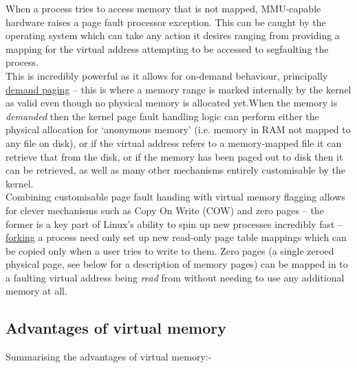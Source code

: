 When a process tries to access memory that is not mapped, MMU-capable hardware
raises a  page fault processor exception. This can be caught
by the operating system which can take any action it desires ranging from
providing a mapping for the virtual address attempting to be accessed to
segfaulting the process.\\

This is incredibly powerful as it allows for on-demand behaviour, principally
\href{https://en.wikipedia.org/wiki/Demand_paging}{demand paging} -- this is
where a memory range is marked internally by the kernel as valid even though no
physical memory is allocated yet.When the memory is \emph{demanded} then the
kernel page fault handling logic can perform either the physical allocation for
`anonymous memory'  (i.e. memory in RAM not mapped to
any file on disk), or if the virtual address refers to a memory-mapped file it
can retrieve that from the disk, or if the memory has been paged out to disk
then it can be retrieved, as well as many other mechanisms entirely customisable
by the kernel.\\

Combining customisable page fault handing with virtual memory flagging allows
for clever mechanisms such as  Copy On Write (COW) and
 zero pages -- the former is a key part of Linux's ability to
spin up new processes incredibly fast -- 
\href{https://en.wikipedia.org/wiki/Fork_(system_call)}{forking} a process need
only set up new read-only page table mappings which can be copied only when a
user tries to write to them. Zero pages (a single zeroed physical page, see
below for a description of memory pages) can be mapped in to a faulting virtual
address being \emph{read} from without needing to use any additional memory at
all.\\

\subsection{Advantages of virtual memory}

Summarising the advantages of virtual memory:-

